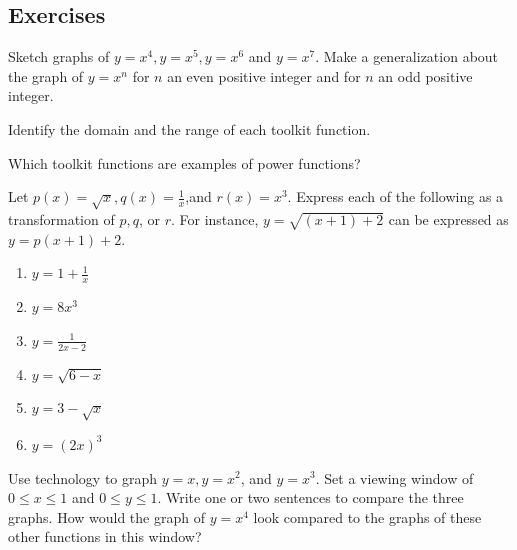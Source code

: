 \documentclass[10pt,]{book}
\theoremstyle{ptxdefinitionnotitle}
\theoremstyle{ptxdefinitiontitle}
\numberwithin{equation}{section}
\begin{document}
\subsection*{Exercises}\hypertarget{exercises-2}{}
\begin{divisionexercise}{1}\hypertarget{exercise-11}{}
\hypertarget{p-61}{}%
Sketch graphs of \(y = x^4, y=x^5, y=x^6\) and \(y=x^7\). Make a generalization about the graph of \(y=x^n\) for \(n\) an even positive integer and for \(n\) an odd positive integer.%
\end{divisionexercise}%
\begin{divisionexercise}{2}\hypertarget{exercise-12}{}
\hypertarget{p-62}{}%
Identify the domain and the range of each toolkit function.%
\end{divisionexercise}%
\begin{divisionexercise}{3}\hypertarget{exercise-13}{}
\hypertarget{p-63}{}%
Which toolkit functions are examples of power functions?%
\end{divisionexercise}%
\begin{divisionexercise}{4}\hypertarget{exercise-14}{}
\hypertarget{p-64}{}%
Let \(p(x) = \sqrt{x}, q(x) = \frac{1}{x}\),and \(r(x) = x^3\). Express each of the following as a transformation of \(p, q\), or \(r\). For instance, \(y = \sqrt{ \left( x+1 \right) + 2 }\) can be expressed as \(y = p\left( x + 1 \right) + 2\). \leavevmode%
\begin{enumerate}[label=(\alph*)]
\item\hypertarget{li-54}{}\(y = 1 + \frac{1}{x}\)%
\item\hypertarget{li-55}{}\(y = 8x^3\)%
\item\hypertarget{li-56}{}\(y = \frac{1}{2x - 2}\)%
\item\hypertarget{li-57}{}\(y = \sqrt{6 - x}\)%
\item\hypertarget{li-58}{}\(y = 3 - \sqrt{x}\)%
\item\hypertarget{li-59}{}\(y = \left( 2x \right)^3\)%
\end{enumerate}
%
\end{divisionexercise}%
\begin{divisionexercise}{5}\hypertarget{exercise-15}{}
\hypertarget{p-65}{}%
Use technology to graph \(y=x, y=x^2\), and \(y=x^3\). Set a viewing window of \(0 \leq x \leq 1\) and \(0 \leq y \leq 1\).  Write one or two sentences to compare the three graphs.  How would the graph of \(y=x^4\) look compared to the graphs of these other functions in this window?%
\end{divisionexercise}%
\end{document}
